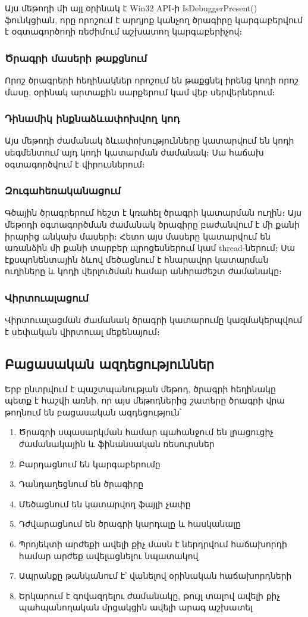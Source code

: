 \documentclass[12pt]{article}
\begin{document}
\begin{sloppypar}
Այս մեթոդի մի այլ օրինակ է Win32 API֊ի IsDebuggerPresent() ֆունկցիան, որը
որոշում է արդյոք կանչող ծրագիրը կարգաբերվում է օգտագործողի ռեժիմում աշխատող
կարգաբերիչով։

\subsubsection{Ծրագրի մասերի թաքցնում}
Որոշ ծրագրերի հեղինակներ որոշում են թաքցնել իրենց կոդի որոշ մասը, օրինակ
արտաքին սարքերում կամ վեբ սերվերներում։

\subsubsection{Դինամիկ ինքնաձևափոխվող կոդ}
Այս մեթոդի ժամանակ ձևափոխությունները կատարվում են կոդի սեգմենտում այդ
կոդի կատարման ժամանակ։ Սա հաճախ օգտագործվում է վիրուսներում։

\subsubsection{Զուգահեռականացում}
Գծային ծրագրերում հեշտ է կռահել ծրագրի կատարման ուղին։ Այս մեթոդի օգտագործման
ժամանակ ծրագիրը բաժանվում է մի քանի իրարից անկախ մասերի։ Հետո այս մասերը
կատարվում են առանձին մի քանի տարբեր պրոցեսներում կամ thread-ներում։ Սա
էքսպոնենտային ձևով մեծացնում է հնարավոր կատարման ուղիները և կոդի վերլուծման
համար անհրաժեշտ ժամանակը։

\subsubsection{Վիրտուալացում}
Վիրտուալացման ժամանակ ծրագրի կատարումը կազմակերպվում է սեփական վիրտուալ
մեքենայում։

\subsection{Բացասական ազդեցություններ}
Երբ ընտրվում է պաշտպանության մեթոդ, ծրագրի հեղինակը պետք է հաշվի առնի, որ
այս մեթոդներից շատերը ծրագրի վրա թողնում են բացասական ազդեցություն՝
\begin{enumerate}
\item Ծրագրի սպասարկման համար պահանջում են լրացուցիչ ժամանակային և ֆինանսական
	ռեսուրսներ
\item Բարդացնում են կարգաբերումը
\item Դանդաղեցնում են ծրագիրը
\item Մեծացնում են կատարվող ֆայլի չափը
\item Դժվարացնում են ծրագրի կարդալը և հասկանալը
\item Պրոյեկտի արժեքի ավելի քիչ մասն է ներդրվում հաճախորդի համար արժեք
	ավելացնելու նպատակով
\item Ապրանքը թանկանում է՝ վանելով օրինական հաճախորդների
\item Երկարում է գովազդելու ժամանակը, թույլ տալով ավելի քիչ պահպանողական
	մրցակցին ավելի արագ աշխատել
\end{enumerate}


\end{sloppypar}
\end{document}
